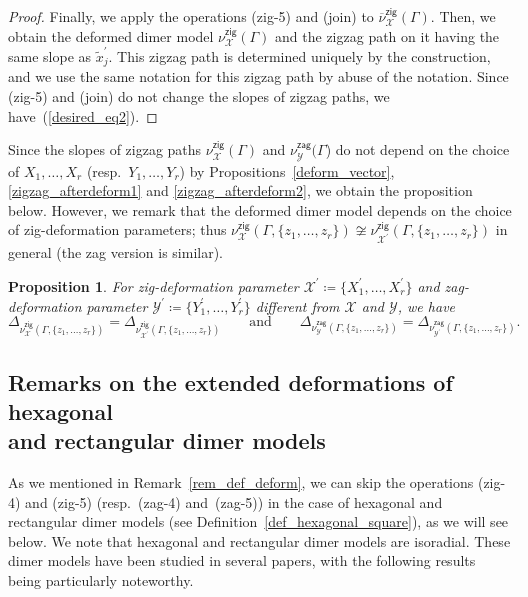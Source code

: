 \documentclass[pdftex]{sigma}%
\numberwithin{equation}{section}
\numberwithin{figure}{section}
\numberwithin{table}{section}
\newtheorem{Proposition}[Theorem]{Proposition}
 { \theoremstyle{definition}
\newtheorem{Definition}[Theorem]{Definition}
\newtheorem{Note}[Theorem]{Note}
\newtheorem{Example}[Theorem]{Example}
\newtheorem{Remark}[Theorem]{Remark}
\newtheorem{observation}[Theorem]{Observation}
\newtheorem{operation}[Theorem]{Operation}
\newtheorem{setting}[Theorem]{Setting}}
\newcommand{\calX}{\mathcal{X}}
\newcommand{\calY}{\mathcal{Y}}
\newcommand{\zig}{\mathsf{zig}}
\newcommand{\zag}{\mathsf{zag}}
\begin{document}
\begin{proof}
Finally, we apply the operations (zig-5) and (join) to $\overline{\nu}_\calX^\zig(\Gamma)$.
Then, we obtain the deformed dimer model $\nu_\calX^\zig(\Gamma)$ and the zigzag path on it having the same slope as $\widetilde{x}^\prime_j$.
This zigzag path is determined uniquely by the construction, and we use the same notation for this zigzag path by abuse of the notation.
Since (zig-5) and (join) do not change the slopes of zigzag paths, we have~(\ref{desired_eq2}).
\end{proof}

Since the slopes of zigzag paths $\nu^\zig_\calX(\Gamma)$ and $\nu^\zag_\calY(\Gamma$) do not depend on
the choice of $X_1,\dots,X_r$ (resp.\ $Y_1,\dots,Y_r$) by Propositions~\ref{deform_vector}, \ref{zigzag_afterdeform1} and \ref{zigzag_afterdeform2},
we obtain the proposition below.
However, we remark that the deformed dimer model depends on the choice of zig-deformation parameters; thus $\nu^\zig_\calX(\Gamma,\{z_1,\dots,z_r\})\not\cong\nu^\zig_{\calX^\prime}(\Gamma,\{z_1,\dots,z_r\})$ in general (the zag version is similar).

\begin{Proposition}\label{other_weight_PMpolygon}
For zig-deformation parameter $\calX^\prime\coloneqq\{X_1^\prime,\dots,X_r^\prime\}$ and
zag-deformation parameter $\calY^\prime\coloneqq\{Y_1^\prime,\dots,Y_r^\prime\}$ different from $\calX$ and $\calY$, we have
\begin{displaymath}
\Delta_{\nu^\zig_\calX(\Gamma,\{z_1,\dots,z_r\})}=\Delta_{\nu^\zig_{\calX^\prime}(\Gamma,\{z_1,\dots,z_r\})}\qquad\text{and}\qquad \Delta_{\nu^\zag_\calY(\Gamma,\{z_1,\dots,z_r\})}=\Delta_{\nu^\zag_{\calY^\prime}(\Gamma,\{z_1,\dots,z_r\})}.
\end{displaymath}
\end{Proposition}

\subsection[Remarks on the extended deformations of hexagonal and rectangular dimer models]{Remarks on the extended deformations of hexagonal\\ and rectangular dimer models}\label{sec_remark_deform}

As we mentioned in Remark~\ref{rem_def_deform}, we can skip the operations (zig-4) and (zig-5) (resp.~(zag-4) and~(zag-5))
in the case of hexagonal and rectangular dimer models (see Definition~\ref{def_hexagonal_square}), as we will see below.
We note that hexagonal and rectangular dimer models are isoradial.
These dimer models have been studied in several papers, with the following results being particularly noteworthy.
\end{document}
